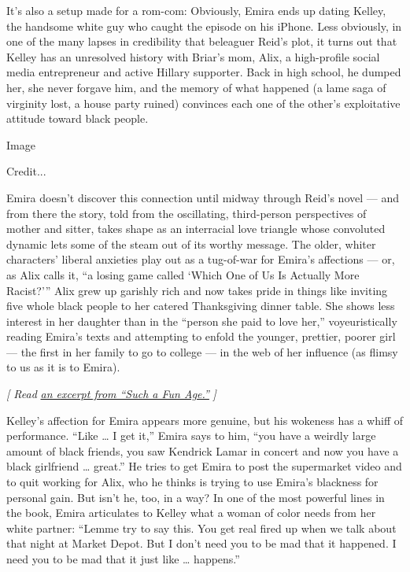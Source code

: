It's also a setup made for a rom-com: Obviously, Emira ends up dating
Kelley, the handsome white guy who caught the episode on his iPhone.
Less obviously, in one of the many lapses in credibility that beleaguer
Reid's plot, it turns out that Kelley has an unresolved history with
Briar's mom, Alix, a high-profile social media entrepreneur and active
Hillary supporter. Back in high school, he dumped her, she never forgave
him, and the memory of what happened (a lame saga of virginity lost, a
house party ruined) convinces each one of the other's exploitative
attitude toward black people.

Image

Credit...

Emira doesn't discover this connection until midway through Reid's novel
--- and from there the story, told from the oscillating, third-person
perspectives of mother and sitter, takes shape as an interracial love
triangle whose convoluted dynamic lets some of the steam out of its
worthy message. The older, whiter characters' liberal anxieties play out
as a tug-of-war for Emira's affections --- or, as Alix calls it, ``a
losing game called `Which One of Us Is Actually More Racist?''' Alix
grew up garishly rich and now takes pride in things like inviting five
whole black people to her catered Thanksgiving dinner table. She shows
less interest in her daughter than in the ``person she paid to love
her,'' voyeuristically reading Emira's texts and attempting to enfold
the younger, prettier, poorer girl --- the first in her family to go to
college --- in the web of her influence (as flimsy to us as it is to
Emira).

\emph{{[} Read}
\href{https://www.nytimes3xbfgragh.onion/2019/12/31/books/review/such-a-fun-age-by-kiley-reid-an-excerpt.html}{\emph{an
excerpt from ``Such a Fun Age.''}} \emph{{]}}

Kelley's affection for Emira appears more genuine, but his wokeness has
a whiff of performance. ``Like \ldots{} I get it,'' Emira says to him,
``you have a weirdly large amount of black friends, you saw Kendrick
Lamar in concert and now you have a black girlfriend \ldots{} great.''
He tries to get Emira to post the supermarket video and to quit working
for Alix, who he thinks is trying to use Emira's blackness for personal
gain. But isn't he, too, in a way? In one of the most powerful lines in
the book, Emira articulates to Kelley what a woman of color needs from
her white partner: ``Lemme try to say this. You get real fired up when
we talk about that night at Market Depot. But I don't need you to be mad
that it happened. I need you to be mad that it just like \ldots{}
happens.''

